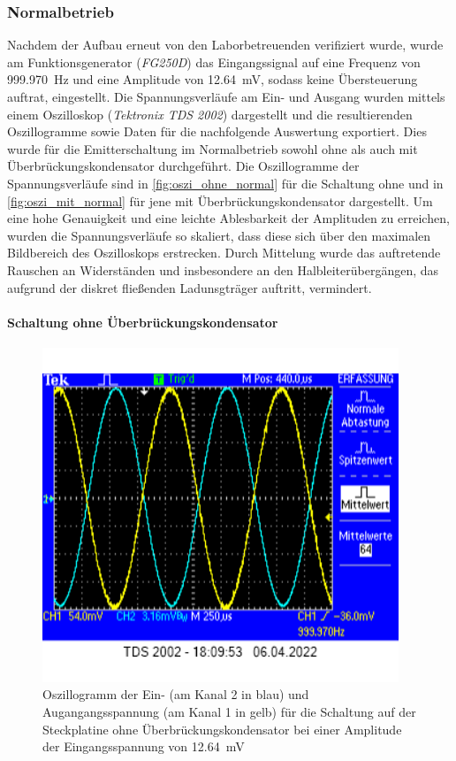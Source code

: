 \documentclass[12pt,english,ngerman]{scrartcl}
\begin{document}
\subsubsection{Normalbetrieb}
Nachdem der Aufbau erneut von den Laborbetreuenden verifiziert wurde, wurde am
Funktionsgenerator (\textit{FG250D}) das Eingangssignal auf eine Frequenz von 
\SI{999,970}{\hertz} und eine Amplitude von \SI{12,64}{\milli\volt}, sodass 
keine Übersteuerung auftrat, eingestellt.
Die Spannungsverläufe am Ein- und Ausgang wurden mittels einem 
Oszilloskop (\textit{Tektronix TDS 2002}) dargestellt und die resultierenden Oszillogramme sowie 
Daten für die nachfolgende Auswertung exportiert. Dies wurde für die Emitterschaltung im
Normalbetrieb sowohl ohne als auch mit Überbrückungskondensator durchgeführt.
Die Oszillogramme der Spannungsverläufe sind in \autoref{fig:oszi_ohne_normal} für die Schaltung
ohne und in \autoref{fig:oszi_mit_normal} für jene mit Überbrückungskondensator dargestellt. 
Um eine hohe Genauigkeit und eine leichte Ablesbarkeit der Amplituden zu erreichen, wurden die
Spannungsverläufe so skaliert, dass diese sich über den maximalen Bildbereich des Oszilloskops
erstrecken. Durch Mittelung wurde das auftretende Rauschen an Widerständen und insbesondere an den 
Halbleiterübergängen, das aufgrund der diskret fließenden Ladunsgträger auftritt, vermindert.

\paragraph{Schaltung ohne Überbrückungskondensator}
\begin{figure}[H]
  \centering
    \includegraphics[width=\linewidth, height=10cm]{./figures/messungen/ohnekond24mv.png}
  \caption{Oszillogramm der Ein- (am Kanal 2 in blau) und Augangangsspannung (am Kanal 1 in gelb) für die Schaltung auf der Steckplatine ohne Überbrückungskondensator bei einer Amplitude der Eingangsspannung von \SI{12,64}{\milli\volt}}
  \label{fig:oszi_ohne_normal}
\end{figure}
\end{document}
